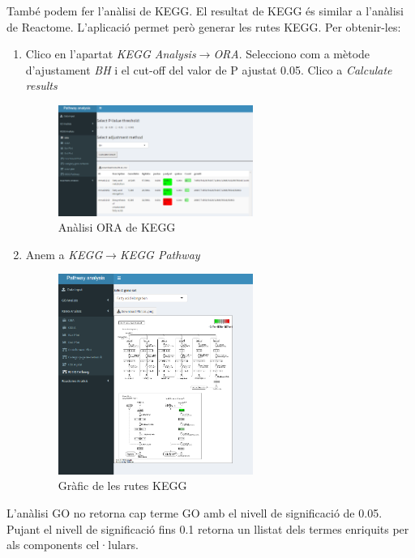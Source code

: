 També podem fer l'anàlisi de KEGG. El resultat de KEGG és similar a l'anàlisi de Reactome. L'aplicació permet però generar les rutes KEGG. Per obtenir-les:

\begin{enumerate}
\item Clico en l'apartat \textit{KEGG Analysis}$\rightarrow$\textit{ORA}. Selecciono com a mètode d'ajustament \textit{BH} i el cut-off del valor de P ajustat 0.05. Clico a \textit{Calculate results}
\begin{figure}[H]
\centering
\includegraphics[width=0.6\textwidth]{Estudi1_Fig11_ORA_KEGG.png} 
\caption{Anàlisi ORA de KEGG}
\end{figure}

\item Anem a \textit{KEGG}$\rightarrow$\textit{KEGG Pathway}
\begin{figure}[H]
\centering
\includegraphics[width=0.6\textwidth]{Estudi1_Fig12_KEGG_Pathway.png} 
\caption{Gràfic de les rutes KEGG}
\end{figure}
\end{enumerate}

L'anàlisi GO no retorna cap terme GO amb el nivell de significació de 0.05. Pujant el nivell de significació fins 0.1 retorna un llistat dels termes enriquits per als components cel·lulars.

